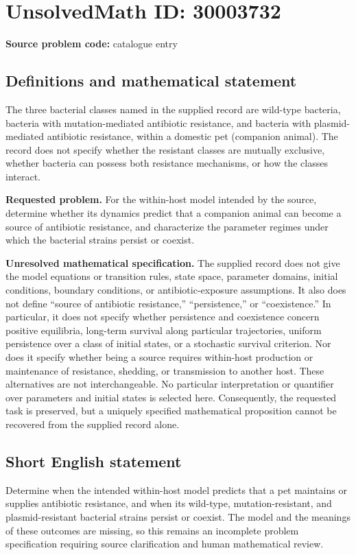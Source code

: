 \documentclass[11pt]{article}
\begin{document}
\section*{UnsolvedMath ID: 30003732}
\textbf{Source problem code:} catalogue entry
\subsection{Definitions and mathematical statement}
The three bacterial classes named in the supplied record are wild-type bacteria, bacteria with mutation-mediated antibiotic resistance, and bacteria with plasmid-mediated antibiotic resistance, within a domestic pet (companion animal). The record does not specify whether the resistant classes are mutually exclusive, whether bacteria can possess both resistance mechanisms, or how the classes interact.

\textbf{Requested problem.} For the within-host model intended by the source, determine whether its dynamics predict that a companion animal can become a source of antibiotic resistance, and characterize the parameter regimes under which the bacterial strains persist or coexist.

\textbf{Unresolved mathematical specification.} The supplied record does not give the model equations or transition rules, state space, parameter domains, initial conditions, boundary conditions, or antibiotic-exposure assumptions. It also does not define ``source of antibiotic resistance,'' ``persistence,'' or ``coexistence.'' In particular, it does not specify whether persistence and coexistence concern positive equilibria, long-term survival along particular trajectories, uniform persistence over a class of initial states, or a stochastic survival criterion. Nor does it specify whether being a source requires within-host production or maintenance of resistance, shedding, or transmission to another host. These alternatives are not interchangeable. No particular interpretation or quantifier over parameters and initial states is selected here. Consequently, the requested task is preserved, but a uniquely specified mathematical proposition cannot be recovered from the supplied record alone.
\subsection{Short English statement}
Determine when the intended within-host model predicts that a pet maintains or supplies antibiotic resistance, and when its wild-type, mutation-resistant, and plasmid-resistant bacterial strains persist or coexist. The model and the meanings of these outcomes are missing, so this remains an incomplete problem specification requiring source clarification and human mathematical review.
\end{document}
